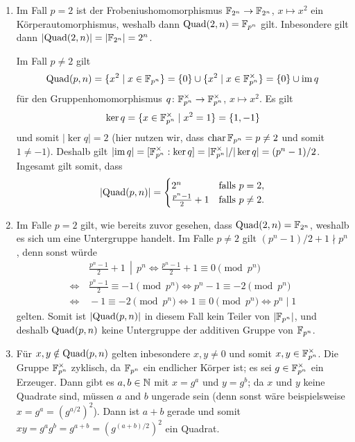 \begin{solution}
  \begin{enumerate}
    \item
      Im Fall $p = 2$ ist der Frobeniushomomorphismus $\mathbb{F}_{2^n} \to \mathbb{F}_{2^n}$, $x \mapsto x^2$ ein Körperautomorphismus, weshalb dann $\operatorname{Quad}(2,n) = \mathbb{F}_{p^n}$ gilt.
      Inbesondere gilt dann $|{\operatorname{Quad}(2,n)}| = |\mathbb{F}_{2^n}| = 2^n$.
      
      Im Fall $p \neq 2$ gilt
      \[
          \operatorname{Quad}(p,n)
        = \{ x^2 \mid x \in \mathbb{F}_{p^n} \}
        = \{0\} \cup \{x^2 \mid x \in \mathbb{F}_{p^n}^\times\}
        = \{0\} \cup \operatorname{im} q
      \]
      für den Gruppenhomomorphismus $q \colon \mathbb{F}_{p^n}^\times \to \mathbb{F}_{p^n}^\times$, $x \mapsto x^2$.
      Es gilt
      \[
          \ker q
        = \{x \in \mathbb{F}_{p^n}^\times \mid x^2 = 1\}
        = \{1,-1\}
      \]
      und somit $|{\ker q}| = 2$ (hier nutzen wir, dass $\operatorname{char} \mathbb{F}_{p^n} = p \neq 2$ und somit $1 \neq -1$).
      Deshalb gilt $|{\operatorname{im} q}| = [\mathbb{F}_{p^n}^\times : \ker q] = |\mathbb{F}_{p^n}^\times|/|\ker q| = (p^n - 1)/2$.
      Ingesamt gilt somit, dass
      \[
          |{\operatorname{Quad}(p,n)}| =
          \begin{cases}
            2^n                   & \text{falls $p = 2$},     \\
            \frac{p^n - 1}{2} + 1 & \text{falls $p \neq 2$}.
          \end{cases}
      \]
      
    \item
      Im Falle $p = 2$ gilt, wie bereits zuvor gesehen, dass $\operatorname{Quad}(2,n) = \mathbb{F}_{2^n}$, weshalb es sich um eine Untergruppe handelt.
      Im Falle $p \neq 2$ gilt $(p^n - 1)/2 + 1 \nmid p^n$, denn sonst würde
      \begin{align*}
            &\, \left. \frac{p^n - 1}{2} + 1 \,\middle|\, p^n \right.
        \iff    \frac{p^n - 1}{2} + 1 \equiv 0 \pmod{p^n}
        \\
        \iff&\, \frac{p^n - 1}{2} \equiv - 1 \pmod{p^n}
        \iff    p^n - 1 \equiv -2 \pmod{p^n}
        \\
        \iff&\, -1 \equiv -2 \pmod{p^n}
        \iff    1 \equiv 0  \pmod{p^n}
        \iff    p^n \mid 1
      \end{align*}
      gelten.
      Somit  ist $|{\operatorname{Quad}(p,n)}|$ in diesem Fall kein Teiler von $|\mathbb{F}_{p^n}|$, und deshalb $\operatorname{Quad}(p,n)$ keine Untergruppe der additiven Gruppe von $\mathbb{F}_{p^n}$.
      
    \item
      Für $x, y \notin \operatorname{Quad}(p,n)$ gelten inbesondere $x, y \neq 0$ und somit $x, y \in \mathbb{F}_{p^n}^\times$.
      Die Gruppe $\mathbb{F}_{p^n}^\times$ zyklisch, da $\mathbb{F}_{p^n}$ ein endlicher Körper ist;
      es sei $g \in \mathbb{F}_{p^n}^\times$ ein Erzeuger.
      Dann gibt es $a, b \in \mathbb{N}$ mit $x = g^a$ und $y = g^b$;
      da $x$ und $y$ keine Quadrate sind, müssen $a$ and $b$ ungerade sein (denn sonst wäre beispielsweise $x = g^a = (g^{a/2})^2$).
      Dann ist $a+b$ gerade und somit $xy = g^a g^b = g^{a+b} = (g^{(a+b)/2})^2$ ein Quadrat.
  \end{enumerate}
\end{solution}


